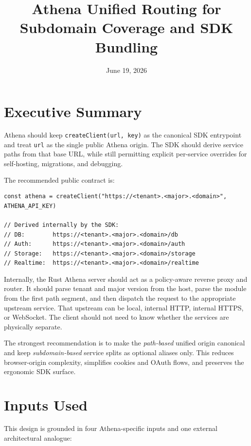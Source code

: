 \documentclass[11pt]{article}
\title{Athena Unified Routing for Subdomain Coverage and SDK Bundling}
\date{June 19, 2026}
\begin{document}
\maketitle

\section{Executive Summary}

Athena should keep \texttt{createClient(url, key)} as the canonical SDK entrypoint and treat \texttt{url} as the single public Athena origin. The SDK should derive service paths from that base URL, while still permitting explicit per-service overrides for self-hosting, migrations, and debugging.

The recommended public contract is:

\begin{lstlisting}[language=TypeScriptAthena]
const athena = createClient("https://<tenant>.<major>.<domain>", ATHENA_API_KEY)

// Derived internally by the SDK:
// DB:        https://<tenant>.<major>.<domain>/db
// Auth:      https://<tenant>.<major>.<domain>/auth
// Storage:   https://<tenant>.<major>.<domain>/storage
// Realtime:  https://<tenant>.<major>.<domain>/realtime
\end{lstlisting}

Internally, the Rust Athena server should act as a policy-aware reverse proxy and router. It should parse tenant and major version from the host, parse the module from the first path segment, and then dispatch the request to the appropriate upstream service. That upstream can be local, internal HTTP, internal HTTPS, or WebSocket. The client should not need to know whether the services are physically separate.

The strongest recommendation is to make the \emph{path-based} unified origin canonical and keep \emph{subdomain-based} service splits as optional aliases only. This reduces browser-origin complexity, simplifies cookies and OAuth flows, and preserves the ergonomic SDK surface.

\section{Inputs Used}

This design is grounded in four Athena-specific inputs and one external architectural analogue:
\end{document}
